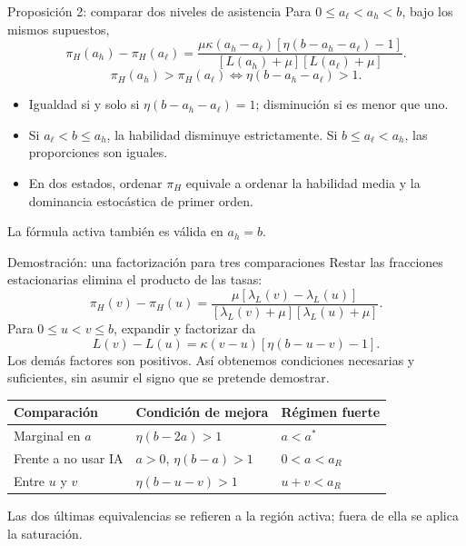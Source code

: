 \documentclass[aspectratio=169,11pt]{beamer}
\newcommand{\source}[1]{\vfill{\tiny\color{black!60}#1}}
\newcommand{\lam}{\lambda_L}
\begin{document}
\begin{frame}{Proposición 2: comparar dos niveles de asistencia}
  Para $0\leq a_\ell<a_h<b$, bajo los mismos supuestos,
  \[
    \pi_H(a_h)-\pi_H(a_\ell)=
    \frac{\mu\kappa(a_h-a_\ell)[\eta(b-a_h-a_\ell)-1]}
         {[L(a_h)+\mu][L(a_\ell)+\mu]}.
  \]
  \[
    \boxed{\pi_H(a_h)>\pi_H(a_\ell)
      \iff\eta(b-a_h-a_\ell)>1.}
  \]
  \begin{itemize}
    \item Igualdad si y solo si $\eta(b-a_h-a_\ell)=1$; disminución si es menor que uno.
    \item Si $a_\ell<b\leq a_h$, la habilidad disminuye estrictamente.
    Si $b\leq a_\ell<a_h$, las proporciones son iguales.
    \item En dos estados, ordenar $\pi_H$ equivale a ordenar la habilidad media
    y la dominancia estocástica de primer orden.
  \end{itemize}
  La fórmula activa también es válida en $a_h=b$.
\end{frame}

\begin{frame}{Demostración: una factorización para tres comparaciones}
  Restar las fracciones estacionarias elimina el producto de las tasas:
  \[
    \pi_H(v)-\pi_H(u)=
    \frac{\mu[\lam(v)-\lam(u)]}{[\lam(v)+\mu][\lam(u)+\mu]}.
  \]
  Para $0\leq u<v\leq b$, expandir y factorizar da
  \[
    L(v)-L(u)=\kappa(v-u)[\eta(b-u-v)-1].
  \]
  Los demás factores son positivos. Así obtenemos condiciones necesarias
  y suficientes, sin asumir el signo que se pretende demostrar.
  \begin{center}\small
  \begin{tabular}{lll}
    \toprule
    Comparación & Condición de mejora & Régimen fuerte\\
    \midrule
    Marginal en $a$ & $\eta(b-2a)>1$ & $a<a^*$\\
    Frente a no usar IA & $a>0$, $\eta(b-a)>1$ & $0<a<a_R$\\
    Entre $u$ y $v$ & $\eta(b-u-v)>1$ & $u+v<a_R$\\
    \bottomrule
  \end{tabular}\end{center}
  \source{Las dos últimas equivalencias se refieren a la región activa; fuera de ella se aplica la saturación.}
\end{frame}
\end{document}
